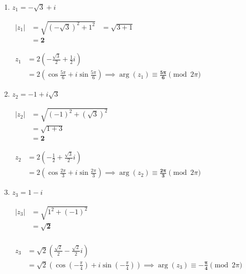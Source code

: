 \documentclass[12pt,a4paper]{article}
\begin{document}
\begin{enumerate}
    \item $z_1 = -\sqrt{3} + i$
    
    $
    \begin{aligned}
        |z_1| &= \sqrt{(-\sqrt{3})^2 + 1^2} 
        &= \sqrt{3 + 1}\\ 
        &= \mathbf{2} 
    \end{aligned}
    $
    
    $
    \begin{aligned}
        z_1 &= 2\left(-\frac{\sqrt{3}}{2} + \frac{1}{2}i\right)\\
        &= 2\left(\cos\frac{5\pi}{6} + i\sin\frac{5\pi}{6}\right) \implies \arg(z_1) \equiv \mathbf{\frac{5\pi}{6}} \pmod{2\pi}
    \end{aligned}
    $
    
    \item $z_2 = -1 + i\sqrt{3}$
    
    $
    \begin{aligned}
        |z_2| &= \sqrt{(-1)^2 + (\sqrt{3})^2}\\ 
        &= \sqrt{1 + 3}\\ 
        &= \mathbf{2} 
    \end{aligned}$

	$
    \begin{aligned}
        z_2 &= 2\left(-\frac{1}{2} + \frac{\sqrt{3}}{2}i\right)\\ 
        &= 2\left(\cos\frac{2\pi}{3} + i\sin\frac{2\pi}{3}\right) \implies \arg(z_2) \equiv \mathbf{\frac{2\pi}{3}} \pmod{2\pi}
    \end{aligned}$

    \item $z_3 = 1 - i$
    
    $
    \begin{aligned}
        |z_3| &= \sqrt{1^2 + (-1)^2}\\
        &= \mathbf{\sqrt{2}} \\
    \end{aligned}$

    $\begin{aligned}
        z_3 &= \sqrt{2}\left(\frac{\sqrt{2}}{2} - \frac{\sqrt{2}}{2}i\right)\\
        &= \sqrt{2}\left(\cos\left(-\frac{\pi}{4}\right) + i\sin\left(-\frac{\pi}{4}\right)\right) \implies \arg(z_3) \equiv \mathbf{-\frac{\pi}{4}} \pmod{2\pi}
    \end{aligned}$
    

\end{enumerate}
\end{document}
